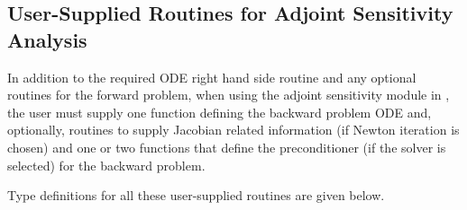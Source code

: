 \subsection{User-Supplied Routines for Adjoint Sensitivity Analysis}\label{ss:user_fct_adj}

In addition to the required ODE right hand side routine and any optional routines
for the forward problem, when using the adjoint sensitivity module in {\cvodes},
the user must supply one function defining the backward problem ODE and, optionally,
routines to supply Jacobian related information (if Newton iteration is chosen) and
one or two functions that define the preconditioner (if the {\cvspgmr} solver is
selected) for the backward problem.

Type definitions for all these user-supplied routines are given below.

